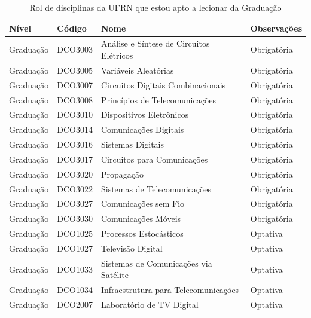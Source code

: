 \documentclass{article}
\begin{document}
\begin{table}[H]
  \centering
  \caption{Rol de disciplinas da UFRN que estou apto a lecionar da Graduação}
  \label{tab:disciplinas-uern}
  \begin{tabular}{|p{}|p{}|p{}|p{}|}
    \hline
    \textbf{Nível} & \textbf{Código} & \textbf{Nome} & \textbf{Observações} \\
    \hline
    Graduação & DCO3003 & Análise e Síntese de Circuitos Elétricos & Obrigatória \\
    \hline
    Graduação & DCO3005 & Variáveis Aleatórias & Obrigatória \\
    \hline
    Graduação & DCO3007 & Circuitos Digitais Combinacionais & Obrigatória \\
    \hline
    Graduação & DCO3008 & Princípios de Telecomunicações & Obrigatória \\
    \hline
    Graduação & DCO3010 & Dispositivos Eletrônicos & Obrigatória \\
    \hline
    Graduação & DCO3014 & Comunicações Digitais & Obrigatória \\
    \hline
    Graduação & DCO3016 & Sistemas Digitais & Obrigatória \\
    \hline
    Graduação & DCO3017 & Circuitos para Comunicações & Obrigatória \\
    \hline
    Graduação & DCO3020 & Propagação & Obrigatória \\
    \hline
    Graduação & DCO3022 & Sistemas de Telecomunicações & Obrigatória \\
    \hline
    Graduação & DCO3027 & Comunicações sem Fio & Obrigatória \\
    \hline
    Graduação & DCO3030 & Comunicações Móveis & Obrigatória \\
    \hline
    Graduação & DCO1025 & Processos Estocásticos & Optativa \\
    \hline
    Graduação & DCO1027 & Televisão Digital & Optativa \\
    \hline
    Graduação & DCO1033 & Sistemas de Comunicações via Satélite & Optativa \\
    \hline
    Graduação & DCO1034 & Infraestrutura para Telecomunicações & Optativa \\
    \hline
    Graduação & DCO2007 & Laboratório de TV Digital & Optativa \\
    \hline
  \end{tabular}
\end{table}
\end{document}
